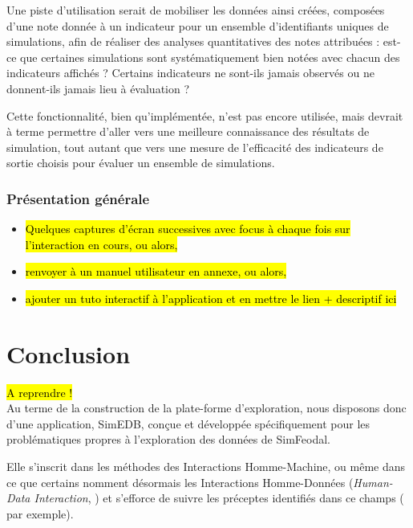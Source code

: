 			Une piste d'utilisation serait de mobiliser les données ainsi créées, composées d'une note donnée à un indicateur pour un ensemble d'identifiants uniques de simulations, afin de réaliser des analyses quantitatives des notes attribuées : est-ce que certaines simulations sont systématiquement bien notées avec chacun des indicateurs affichés ? Certains indicateurs ne sont-ils jamais observés ou ne donnent-ils jamais lieu à évaluation ?
			
			Cette fonctionnalité, bien qu'implémentée, n'est pas encore utilisée, mais devrait à terme permettre d'aller vers une meilleure connaissance des résultats de simulation, tout autant que vers une mesure de l'efficacité des indicateurs de sortie choisis pour évaluer un ensemble de simulations.

		\subsubsection{Présentation générale}
			 
			 	\begin{itemize}
			 		\item \hl{Quelques captures d'écran successives avec focus à chaque fois sur l'interaction en cours, ou alors,}
			 		\item \hl{renvoyer à un manuel utilisateur en annexe, ou alors,}
			 		\item \hl{ajouter un tuto interactif à l'application et en mettre le lien + descriptif ici}
			 	\end{itemize}
			
	\section*{Conclusion}
	
	\hl{A reprendre !}\\
	Au terme de la construction de la plate-forme d'exploration, nous disposons donc d'une application, SimEDB, conçue et développée spécifiquement pour les problématiques propres à l'exploration des données de SimFeodal.
	
	Elle s'inscrit dans les méthodes des Interactions Homme-Machine, ou même dans ce que certains nomment désormais les \og Interactions Homme-Données\fg{} (\og \textit{Human-Data Interaction}\fg{}, \cite{elmqvist_embodied_2011,mortier_human-data_2014}) et s'efforce de suivre les préceptes identifiés dans ce champs (\cite[167-170]{amirpour_amraii_human-data_2018} par exemple).
	
